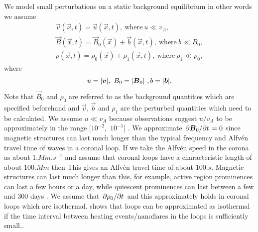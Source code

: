 We model small perturbations on a static background equilibrium in other words we assume
\begin{gather}
    \label{eq:linear_assumotion_v}
    \vec{v}(\vec{x},t) = \vec{u}(\vec{x},t),\ \text{where}\ u\ll v_A,\\
    \label{eq:linear_assumotion_b}
    \vec{B}(\vec{x},t) = \vec{B}_0(\vec{x}) + \vec{b}(\vec{x},t),\ \text{where}\ b\ll B_0, \\
    \label{eq:linear_assumotion_rho}
    \rho(\vec{x},t) = \rho_0(\vec{x}) + \rho_1(\vec{x},t),\ \text{where}\ \rho_1\ll \rho_0,
\end{gather}
where
\[u = \abs{\vec{v}},\ B_0=\abs{\vec{B}_0}\ ,b=\abs{\vec{b}}.\] Note that $\vec{B}_0$ and $\rho_0$ are referred to as the background quantities which are specified beforehand and $\vec{v}$, $\vec{b}$ and $\rho_1$ are the perturbed quantities which need to be calculated.
We assume $u\ll v_A$ because observations suggest $u / v_A$ to be approximately in the range [$10^{-2}$,\ $10^{-1}$] \citep{McIntosh2011,McIntosh2012}. We approximate $\pdv*{\boldsymbol{B}_0}{t}=0$ since magnetic structures can last much longer than the typical frequency and Alfv\'en travel time of waves in a coronal loop. If we take the Alfv\'en speed in the corona as about $1\si{.Mm.s^{-1}}$ \citep{McIntosh2011} and assume that coronal loops have a characteristic length of about 100$\si{.Mm}$ \citep{O'Neill2005} then This gives an Alfv\'en travel time of about $100\si{.s}$. Magnetic structures can last much longer than this, for example, active region prominences can last a few hours or a day, while quiescent prominences can last between a few and 300 days \citep{Priest2014}. We assume that $\pdv*{\rho_0}{t}$ and this approximately holds in coronal loops which are isothermal. \citet{Klimchuk2015} shows that loops can be approximated as isothermal if the time interval between heating events/nanoflares in the loops is sufficiently small..
